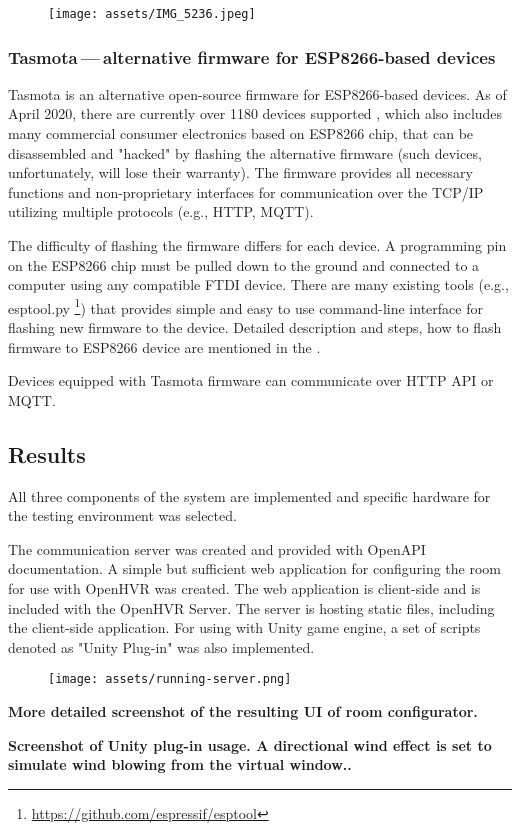 \begin{figure}[h]{}
\centering\texttt{[image: assets/IMG\_5236.jpeg]}
\caption{}

\end{figure}

\hypertarget{x-tasmota — alternative-firmware-for-esp8266-based-devices}{\subsubsection*{Tasmota — alternative firmware for ESP8266-based devices}}
Tasmota is an alternative open-source firmware for ESP8266-based devices.
As of April 2020, there are currently over 1180 devices supported \hyperlink{tasdirec}{},
which also includes many commercial consumer electronics based on ESP8266 chip,
that can be disassembled and "hacked" by flashing the alternative firmware
(such devices, unfortunately, will lose their warranty).
The firmware provides all necessary functions and non-proprietary
interfaces for communication over the TCP/IP utilizing multiple protocols
(e.g., HTTP, MQTT).


The difficulty of flashing the firmware differs for each device. A programming pin
on the ESP8266 chip must be pulled down to the ground and connected to a computer using
any compatible FTDI device. There are many existing tools (e.g., esptool.py
\footnote{\href{https://github.com/espressif/esptool}{https://github.com/espressif/esptool}})
that provides simple and easy to use command-line
interface for flashing new firmware to the device. Detailed description and
steps, how to flash firmware to ESP8266 device are mentioned in the
\hyperlink{./12-install-guide}{}.


Devices equipped with Tasmota firmware can communicate over HTTP API or MQTT.


\hypertarget{x-results}{\subsection*{Results}}
All three components of the system are implemented and specific hardware
for the testing environment was selected.


The communication server was created and provided with OpenAPI documentation.
A simple but sufficient web application for configuring the room for use with
OpenHVR was created. The web application is client-side and is included with
the OpenHVR Server. The server is hosting static files,
including the client-side application.
For using with Unity game engine, a set of scripts denoted as "Unity Plug-in"
was also implemented.


\begin{figure}[h]{}
\centering\texttt{[image: assets/running-server.png]}
\caption{}

\end{figure}

\textbf{More detailed screenshot of the resulting UI of room configurator.} 


\textbf{Screenshot of Unity plug-in usage. A directional wind effect is set to simulate wind blowing from the virtual window..} 



